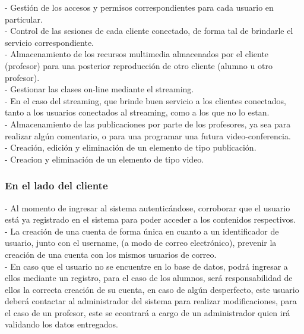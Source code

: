 \documentclass[12pt]{article}
\begin{document}
-	Gestión de los accesos y permisos correspondientes para cada usuario en particular.\\

-	Control de las sesiones de cada cliente conectado, de forma tal de brindarle el servicio correspondiente.\\

-	Almacenamiento de los recursos multimedia almacenados por el cliente (profesor) para una posterior
reproducción de otro cliente (alumno u otro profesor).\\

-	Gestionar las clases on-line mediante el streaming.\\

-	En el caso del streaming, que brinde buen servicio a los clientes conectados, tanto a los usuarios
conectados al streaming, como a los que no lo estan.\\

-	Almacenamiento de las publicaciones por parte de los profesores, ya sea para realizar algún comentario,
	o para una programar una futura video-conferencia.\\

-	Creación, edición y eliminación de un elemento de tipo publicación.\\

- 	Creacion y eliminación de un elemento de tipo video.\\


\subsubsection{En el lado del cliente}

-	Al momento de ingresar al sistema autenticándose, corroborar que el usuario está ya registrado en
el sistema para poder acceder a los contenidos respectivos.\\

- 	La creación de una cuenta de forma única en cuanto a un identificador de usuario, junto con el username,
	(a modo de correo electrónico), prevenir la creación de una cuenta con los mismos usuarios de correo.\\

-	En caso que el usuario no se encuentre en lo base de datos, podrá ingresar a ellos mediante un 
registro, para el caso de los alumnos, será responsabilidad de ellos la correcta creación de su cuenta,
en caso de algún desperfecto, este usuario deberá contactar al administrador del sistema para realizar 
modificaciones, para el caso de un profesor, este se econtrará a cargo de un administrador quien irá validando 
los datos entregados.\\
\end{document}
